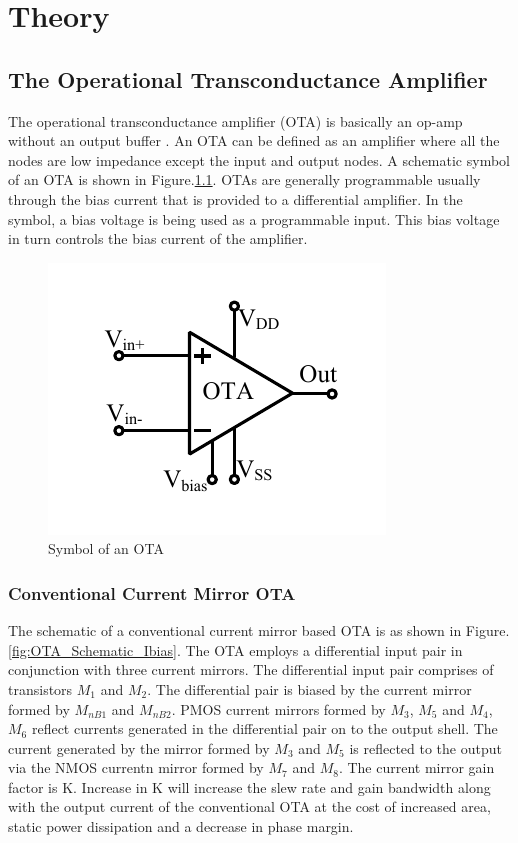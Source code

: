 \chapter{Theory}
\section{The Operational Transconductance Amplifier}
The operational transconductance amplifier (OTA) is basically an op-amp without an output buffer \cite{baker_book}. An OTA can be defined as an amplifier where all the nodes are low impedance except the input and output nodes. A schematic symbol of an OTA is shown in Figure.\ref{fig:OTA_symbol}. OTAs are generally programmable usually through the bias current that is provided to a differential amplifier. In the symbol, a bias voltage is being used as a programmable input. This bias voltage in turn controls the bias current of the amplifier.

\begin{figure} [H]
\centering
\includegraphics[scale=1]{Figures/System_Level/OTA_Symbol.pdf}
\caption{Symbol of an OTA}
\label{fig:OTA_symbol}
\end{figure}

\subsection{Conventional Current Mirror OTA}
The schematic of a conventional current mirror based OTA is as shown in Figure.\ref{fig:OTA_Schematic_Ibias}. The OTA employs a differential input pair in conjunction with three current mirrors. The differential input pair comprises of transistors $M_1$ and $M_2$. The differential pair is biased by the current mirror formed by $M_{nB1}$ and $M_{nB2}$. PMOS current mirrors formed by $M_3$, $M_5$ and $M_4$, $M_6$ reflect currents generated in the differential pair on to the output shell. The current generated by the mirror formed by $M_3$ and $M_5$ is reflected to the output via the NMOS currentn mirror formed by $M_7$ and $M_8$. The current mirror gain factor is K. Increase in K will increase the slew rate and gain bandwidth along with the output current of the conventional OTA at the cost of increased area, static power dissipation and a decrease in phase margin.

